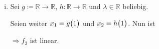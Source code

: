 \documentclass{scrreprt}
\begin{document}
\begin{enumerate}[(a)]
\begin{enumerate}[(i)]
  \item Sei $g \coloneqq \mathbb{R} \to \mathbb{R}$,
    $h \colon \mathbb{R} \to \mathbb{R}$ und $\lambda \in \mathbb{R}$
    beliebig.

    Seien weiter $x_1 = g\qty\big(1)$ und $x_2 = h\qty\big(1)$.
    Nun ist
    $\Rightarrow f_3$ ist linear.


\end{enumerate}
\end{enumerate}
\end{document}
